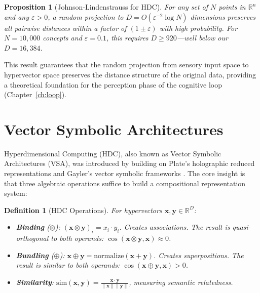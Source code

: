 \documentclass[12pt]{book}
\newtheorem{definition}[theorem]{Definition}
\newtheorem{proposition}[theorem]{Proposition}
\newcommand{\bind}{\otimes}
\newcommand{\bundle}{\oplus}
\newcommand{\R}{\mathbb{R}}
\begin{document}
\begin{proposition}[Johnson-Lindenstrauss for HDC]
For any set of $N$ points in $\R^n$ and any $\varepsilon > 0$, a random projection to $D = O(\varepsilon^{-2} \log N)$ dimensions preserves all pairwise distances within a factor of $(1 \pm \varepsilon)$ with high probability. For $N = 10{,}000$ concepts and $\varepsilon = 0.1$, this requires $D \geq 920$---well below our $D = 16{,}384$.
\end{proposition}

This result guarantees that the random projection from sensory input space to hypervector space preserves the distance structure of the original data, providing a theoretical foundation for the perception phase of the cognitive loop (Chapter~\ref{ch:loop}).

\section{Vector Symbolic Architectures}

Hyperdimensional Computing (HDC), also known as Vector Symbolic Architectures (VSA), was introduced by \citet{kanerva2009hyperdimensional} building on Plate's holographic reduced representations \citep{plate2003holographic} and Gayler's vector symbolic frameworks \citep{gayler2003vector}. The core insight is that three algebraic operations suffice to build a compositional representation system:

\begin{definition}[HDC Operations]\label{def:hdc-ops}
For hypervectors $\mathbf{x}, \mathbf{y} \in \R^D$:
\begin{itemize}
  \item \textbf{Binding} ($\bind$): $(\mathbf{x} \bind \mathbf{y})_i = x_i \cdot y_i$. Creates associations. The result is quasi-orthogonal to both operands: $\cos(\mathbf{x} \bind \mathbf{y}, \mathbf{x}) \approx 0$.
  \item \textbf{Bundling} ($\bundle$): $\mathbf{x} \bundle \mathbf{y} = \text{normalize}(\mathbf{x} + \mathbf{y})$. Creates superpositions. The result is similar to both operands: $\cos(\mathbf{x} \bundle \mathbf{y}, \mathbf{x}) > 0$.
  \item \textbf{Similarity}: $\text{sim}(\mathbf{x}, \mathbf{y}) = \frac{\mathbf{x} \cdot \mathbf{y}}{\|\mathbf{x}\| \|\mathbf{y}\|}$, measuring semantic relatedness.
\end{itemize}
\end{definition}
\end{document}
